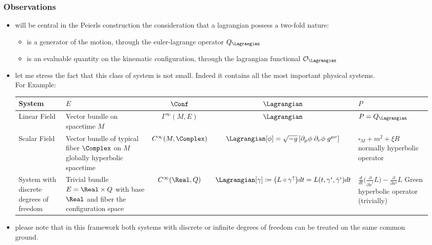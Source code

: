 \documentclass[a4paper,11pt]{scrartcl}
\begin{document}
    \subsubsection*{Observations}
    \begin{itemize}
        \item will be central in the Peierls construction the consideration that a lagrangian possess a two-fold nature:
        \begin{itemize}
            \item is a generator of the motion, through the euler-lagrange operator $Q_\Lagrangian$
            \item is an evaluable quantity on the kinematic configuration, through the lagrangian functional $ \mathcal{O}_\Lagrangian$
        \end{itemize}
        \item let me stress the fact that this class of system is not small. Indeed it contains all the most important physical systems. \\
        For Example:
        
        \begin{tabular}{|p{3cm}|p{3cm}|c|c|p{3cm}|}
            \hline
            System & $E$  & $\Conf$ & $\Lagrangian$ & $P$ \\
            \hline
            Linear Field & \footnotesize{Vector bundle on spacetime} $M$ & $\Gamma^\infty(M,E)$ & $\Lagrangian$ & $P=Q_\Lagrangian$ \\
            \hline
            Scalar Field &
            \footnotesize{Vector bundle of typical fiber $\Complex$ on $M$ globally hyperbolic spacetime}&
            $C^\infty(M, \Complex)$ &
            $\Lagrangian[\phi] = \sqrt{-g} \left[ \partial_\mu \phi \; \partial_\nu \phi \; g^{\mu \nu} \right]$ &
            $\square_M + m^2 + \xi R$
            \newline
            \footnotesize{normally hyperbolic operator}\\
            \hline
            System with discrete degrees of freedom & 
            \footnotesize{Trivial bundle $E=\Real\times Q$ with base $\Real$ and fiber the configuration space} &
            $C^\infty(\Real,Q)$ &
            $\Lagrangian  [\gamma] \coloneqq \big( L \circ    \gamma^\uparrow \big) dt  = L(t,\gamma^i,\dot{\gamma}^i) dt$ &
            $\frac{d}{dt}\big(\frac{\partial}{\partial \dot{x}^i}L\big)-\frac{\partial}{\partial x^i}L $     
                        \newline
            \footnotesize{Green hyperbolic operator (trivially)} \\            
            \hline
        \end{tabular}
        
        \item please note that in this framework both systems with discrete or infinite degrees of freedom can be treated on the same common ground.
    \end{itemize}
    \newpage
\end{document}
